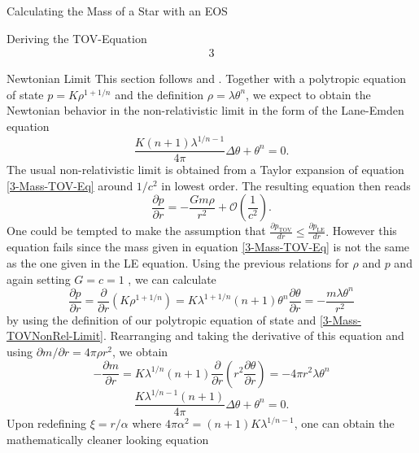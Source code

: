 \begin{section}{Calculating the Mass of a Star with an EOS}
\begin{subsection}{Deriving the TOV-Equation}
\begin{alignat}{3}
	\label{3-Mass-TOV-Eq}
\end{alignat}
\end{subsection}
%
%
%
\pagebreak
\begin{subsection}{Newtonian Limit}
\label{3-Mass-LEDerivation}
This section follows \cite{weissteinLaneEmdenDifferentialEquation} and \cite[89\psqq]{chandrasekharChandrasekharAnIntroductionStudy1958}. Together with a polytropic equation of state $p=K\rho^{1+1/n}$ and the definition $\rho=\lambda\theta^n$, we expect to obtain the Newtonian behavior in the non-relativistic limit in the form of the Lane-Emden equation
\begin{equation}
	\frac{K(n+1)\lambda^{1/n-1}}{4\pi}\Delta\theta+\theta^n=0.
\end{equation}
The usual non-relativistic limit is obtained from a Taylor expansion of equation \ref{3-Mass-TOV-Eq} around $1/c^2$ in lowest order. The resulting equation then reads
\begin{equation}
	\frac{\partial p}{\partial r} = -\frac{Gm\rho}{r^2} + \mathcal{O}\left(\frac{1}{c^2}\right).
	\label{3-Mass-TOVNonRel-Limit}
\end{equation}
One could be tempted to make the assumption that $\frac{\partial p_{\text{TOV}}}{dr} \leq \frac{\partial p_{\text{LE}}}{dr}.$ However this equation fails since the mass given in equation \ref{3-Mass-TOV-Eq} is not the same as the one given in the LE equation. Using the previous relations for $\rho$ and $p$ and again setting $G=c=1$ , we can calculate
\begin{equation}
	\frac{\partial p}{\partial r} = \frac{\partial}{\partial r}\left(K\rho^{1+1/n}\right)= K\lambda^{1+1/n}(n+1)\theta^n\frac{\partial\theta}{\partial r} = -\frac{m\lambda\theta^n}{r^2}
\end{equation}
by using the definition of our polytropic equation of state and \ref{3-Mass-TOVNonRel-Limit}. Rearranging and taking the derivative of this equation and using $\partial m/\partial r = 4\pi\rho r^2$, we obtain
\begin{equation}
	- \frac{\partial m}{\partial r} = K\lambda^{1/n}(n+1)\frac{\partial}{\partial r}\left(r^2\frac{\partial\theta}{\partial r}\right) = -4\pi r^2\lambda\theta^n
\end{equation}
\begin{equation}
	\frac{K\lambda^{1/n-1}(n+1)}{4\pi}\Delta\theta+\theta^n=0.
\end{equation}
Upon redefining $\xi=r/\alpha$ where $4\pi\alpha^2=(n+1)K\lambda^{1/n-1}$, one can obtain the mathematically cleaner looking equation

\end{subsection}
\end{section}

